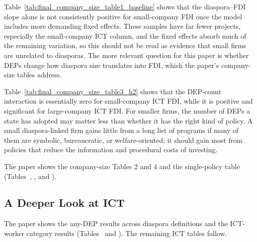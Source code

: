 \documentclass[12pt]{article}
\let\oldsubsection\subsection
\renewcommand{\subsection}{\FloatBarrier\oldsubsection}
\begin{document}


Table~\ref{tab:final_company_size_table1_baseline} shows that the diaspora--FDI slope alone is not consistently positive for small-company FDI once the model includes more demanding fixed effects. These samples have far fewer projects, especially the small-company ICT column, and the fixed effects absorb much of the remaining variation, so this should not be read as evidence that small firms are unrelated to diasporas. The more relevant question for this paper is whether DEPs change how diaspora size translates into FDI, which the paper's company-size tables address.


Table~\ref{tab:final_company_size_table3_h2} shows that the DEP-count interaction is essentially zero for small-company ICT FDI, while it is positive and significant for large-company ICT FDI. For smaller firms, the number of DEPs a state has adopted may matter less than whether it has the right kind of policy. A small diaspora-linked firm gains little from a long list of programs if many of them are symbolic, bureaucratic, or welfare-oriented; it should gain most from policies that reduce the information and procedural costs of investing.

The paper shows the company-size Tables 2 and 4 and the single-policy table (Tables~, , and ).

\FloatBarrier
\subsection{A Deeper Look at ICT} \label{ss:ict}

The paper shows the any-DEP results across diaspora definitions and the ICT-worker category results (Tables~ and ). The remaining ICT tables follow.








\end{document}
